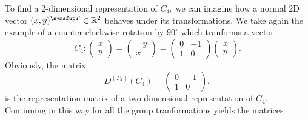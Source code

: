 To find a $2$-dimensional representation of $C_{4v}$ we can imagine how a normal $2$D vector $(x,y)^\trans\in\mathbb{R}^2$ behaves under its transformations.
We take again the example of a counter clockwise rotation by $90^\circ$ which tranforms a vector
\begin{equation}
    \label{eq:Group:Symm:C4transform}
    C_4:\begin{pmatrix}
        x\\
        y
    \end{pmatrix} = 
    \begin{pmatrix}
        -y\\
        x
    \end{pmatrix} = 
    \begin{pmatrix}
        0 & -1\\
        1 & 0
    \end{pmatrix}
    \begin{pmatrix}
        x\\
        y
    \end{pmatrix}.
\end{equation}
Obviously, the matrix 
\begin{equation}
    \label{eq:Group:Symm:C4G5D}
    D^{(\Gamma_5)}(C_4) = 
    \begin{pmatrix}
        0 & -1\\
        1 & 0
    \end{pmatrix},
\end{equation}
is the representation matrix of a two-dimensional representation of $C_4$. Continuing in this way for all the group tranformations yields the matrices

